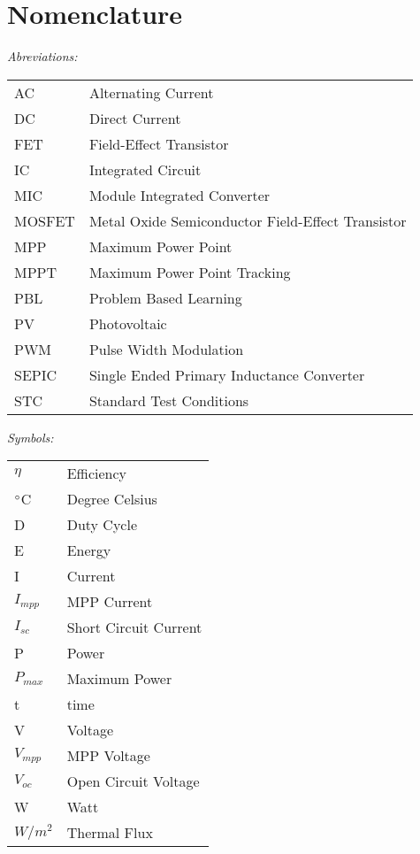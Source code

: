 \chapter*{Nomenclature}

\textit{Abreviations:}\newline
\begin{tabular}{ll} %
AC & Alternating Current\\
DC & Direct Current\\
FET & Field-Effect Transistor\\
IC & Integrated Circuit\\
MIC & Module Integrated Converter\\
MOSFET & Metal Oxide Semiconductor Field-Effect Transistor\\
MPP & Maximum Power Point\\
MPPT & Maximum Power Point Tracking\\
PBL & Problem Based Learning\\
PV & Photovoltaic\\
PWM & Pulse Width Modulation\\
SEPIC & Single Ended Primary Inductance Converter\\
STC & Standard Test Conditions\\
\end{tabular}

\vspace{10mm} %

\textit{Symbols:}\newline
\begin{tabular}{ll}
$\eta$ & Efficiency\\
$\dec$C & Degree Celsius\\
D & Duty Cycle\\
E & Energy\\
I & Current\\
$I_{mpp}$ & MPP Current\\
$I_{sc}$ & Short Circuit Current\\
P & Power\\
$P_{max}$ & Maximum Power\\
t & time\\
V & Voltage\\
$V_{mpp}$ & MPP Voltage\\
$V_{oc}$ & Open Circuit Voltage\\
W & Watt\\
$W/m^2$ & Thermal Flux\\
\end{tabular}
